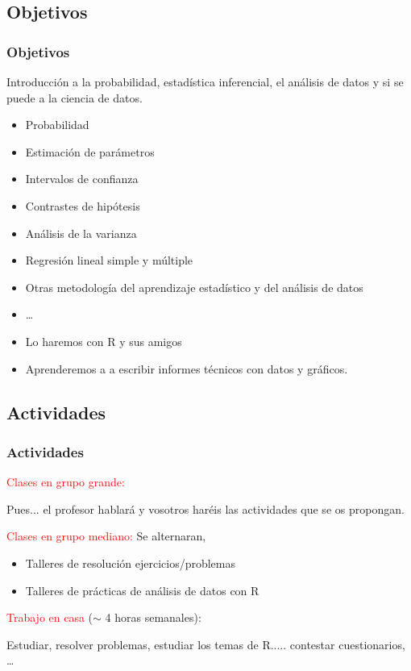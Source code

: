 \documentclass[12pt,t]{beamer}
\newcommand{\red}[1]{\textcolor{red}{#1}}
\theoremstyle{plain}
\theoremstyle{definition}
\begin{document}
\subsection{Objetivos}
\begin{frame}
\frametitle{Objetivos}
\medskip

Introducción a la probabilidad, estadística inferencial, el análisis de datos y si se puede a la ciencia de datos.
\medskip

\begin{itemize}
\item Probabilidad
\item Estimación de parámetros
\item Intervalos de confianza
\item Contrastes de hipótesis
\item Análisis de la varianza
\item Regresión lineal simple y múltiple
\item Otras metodología del aprendizaje estadístico  y del análisis de datos
\item \ldots\pause
\item Lo haremos con R y sus amigos
\item Aprenderemos a a escribir informes técnicos con datos y gráficos.

\end{itemize}


\end{frame}

\subsection{Actividades}
\begin{frame}
\frametitle{Actividades}

\red{Clases en grupo grande:}
\smallskip

Pues... el profesor hablará y vosotros haréis las actividades  que se os propongan.\bigskip

\red{Clases en grupo mediano:} Se alternaran,
\smallskip

\begin{itemize}
\item Talleres de resolución ejercicios/problemas

\item Talleres de prácticas de análisis de datos con R
\end{itemize}
\bigskip
\pause

\red{Trabajo en casa} ($\sim$ 4 horas semanales):
\smallskip

Estudiar, resolver problemas, estudiar los temas de R..... contestar cuestionarios, \ldots
\smallskip

\end{frame}
\end{document}
